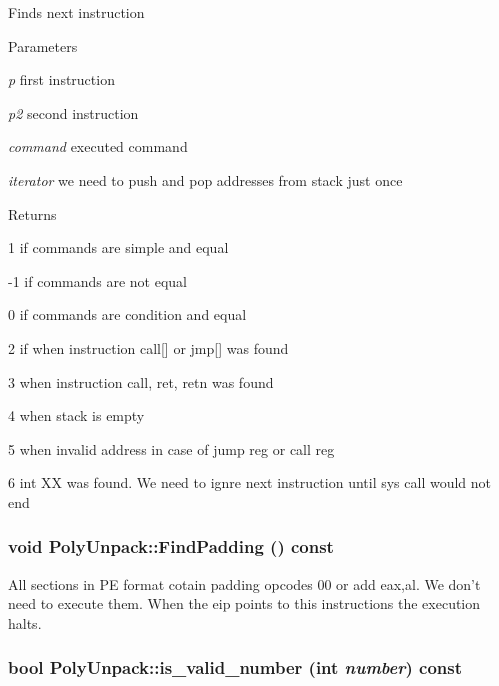 \label{classPolyUnpack_a2eaa3c2d81d64f76659dadc75c931a89}
Finds next instruction 
\begin{DoxyParams}{Parameters}
\item[{\em p}]first instruction \item[{\em p2}]second instruction \item[{\em command}]executed command \item[{\em iterator}]we need to push and pop addresses from stack just once \end{DoxyParams}
\begin{DoxyReturn}{Returns}

\begin{DoxyItemize}
\item 1 if commands are simple and equal 
\item -\/1 if commands are not equal 
\item 0 if commands are condition and equal 
\item 2 if when instruction call\mbox{[}\mbox{]} or jmp\mbox{[}\mbox{]} was found 
\item 3 when instruction call, ret, retn was found 
\item 4 when stack is empty 
\item 5 when invalid address in case of jump reg or call reg 
\item 6 int XX was found. We need to ignre next instruction until sys call would not end 
\end{DoxyItemize}
\end{DoxyReturn}
\hypertarget{classPolyUnpack_a6c4a3e26f38983c9a1134b98614f1cdb}{
\subsubsection[{FindPadding}]{\setlength{\rightskip}{0pt plus 5cm}void PolyUnpack::FindPadding () const}}
\label{classPolyUnpack_a6c4a3e26f38983c9a1134b98614f1cdb}
All sections in PE format cotain padding opcodes 00 or add eax,al. We don't need to execute them. When the eip points to this instructions the execution halts. \hypertarget{classPolyUnpack_a8975a0eb244e7fdd8e7acea9555227bf}{
\subsubsection[{is\_\-valid\_\-number}]{\setlength{\rightskip}{0pt plus 5cm}bool PolyUnpack::is\_\-valid\_\-number (int {\em number}) const}}
\label{classPolyUnpack_a8975a0eb244e7fdd8e7acea9555227bf}

